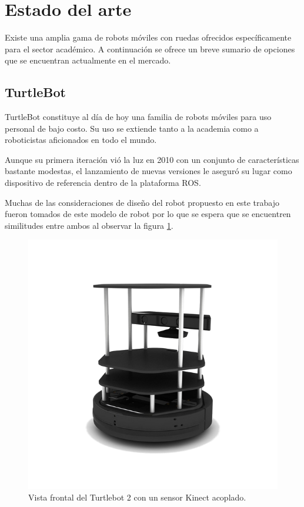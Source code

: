 \newpage

\section{Estado del arte}

Existe una amplia gama de robots móviles con ruedas ofrecidos específicamente para el sector académico. A continuación se ofrece un breve sumario de opciones que se encuentran actualmente en el mercado.

\subsection{TurtleBot}

TurtleBot constituye al día de hoy una familia de robots móviles para uso personal de bajo costo. Su uso se extiende tanto a la academia como a roboticistas aficionados en todo el mundo.

Aunque su primera iteración vió la luz en 2010 con un conjunto de características bastante modestas, el lanzamiento de nuevas versiones le aseguró su lugar como dispositivo de referencia dentro de la plataforma ROS.

Muchas de las consideraciones de diseño del robot propuesto en este trabajo fueron tomados de este modelo de robot por lo que se espera que se encuentren similitudes entre ambos al observar la figura \ref{fig:robotTurtlebot}.

\begin{figure}[ht]
	\centering
	\includegraphics[scale=1.5]{./Figures/turtlebot.png}
	\caption{Vista frontal del Turtlebot 2 con un sensor Kinect acoplado.\protect\footnotemark}
	\label{fig:robotTurtlebot}
\end{figure}

